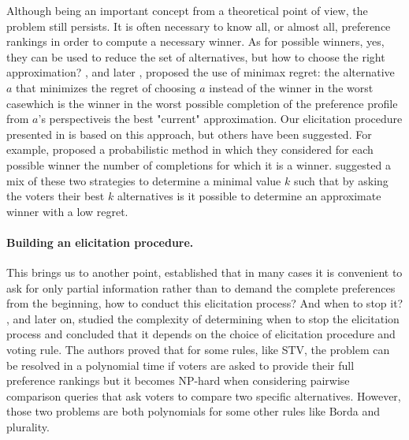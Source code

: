 Although being an important concept from a theoretical point of view, the problem still persists. It is often necessary to know all, or almost all, preference rankings in order to compute a necessary winner. As for possible winners, yes, they can be used to reduce the set of alternatives, but how to choose the right approximation?
\citet{Boutilier2006}, and later \citet{Lu2011}, proposed the use of minimax regret: the alternative $a$ that minimizes the regret of choosing $a$ instead of the winner in the worst case\textemdash which is the winner in the worst possible completion of the preference profile from $a$'s perspective\textemdash is the best "current" approximation.
Our elicitation procedure presented in  is based on this approach, but others have been suggested.
For example, \citet{Bachrach2010} proposed a probabilistic method in which they considered for each possible winner the number of completions for which it is a winner.
\citet{Lu2011Prob} suggested a mix of these two strategies to determine a minimal value $k$ such that by asking the voters their best $k$ alternatives is it possible to determine an approximate winner with a low regret.
\paragraph{Building an elicitation procedure.}
This brings us to another point, established that in many cases it is convenient to ask for only partial information rather than to demand the complete preferences from the beginning, how to conduct this elicitation process? And when to stop it?
\citet{Conitzer2002}, and \citet{Walsh2009} later on, studied the complexity of determining when to stop the elicitation process and concluded that it depends on the choice of elicitation procedure and voting rule. The authors proved that for some rules, like \ac{STV}, the problem can be resolved in a polynomial time if voters are asked to provide their full preference rankings but it becomes NP-hard when considering pairwise comparison queries that ask voters to compare two specific alternatives. However, those two problems are both polynomials for some other rules like Borda and plurality.

